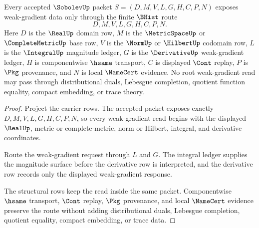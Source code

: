 \begin{theorem}
\label{thm:sobolev-root-weak-gradient-carrier}
Every accepted $\SobolevUp$ packet $S=(D,M,V,L,G,H,C,P,N)$ exposes weak-gradient data only through the finite $\BHist$ route
$$
D,M,V,L,G,H,C,P,N .
$$
Here $D$ is the $\RealUp$ domain row, $M$ is the $\MetricSpaceUp$ or $\CompleteMetricUp$ base row, $V$ is the $\NormUp$ or $\HilbertUp$ codomain row, $L$ is the $\IntegralUp$ magnitude ledger, $G$ is the $\DerivativeUp$ weak-gradient ledger, $H$ is componentwise $\hsame$ transport, $C$ is displayed $\Cont$ replay, $P$ is $\Pkg$ provenance, and $N$ is local $\NameCert$ evidence. No root weak-gradient read may pass through distributional duals, Lebesgue completion, quotient function equality, compact embedding, or trace theory.
\end{theorem}
\begin{proof}
Project the carrier rows. The accepted packet exposes exactly $D,M,V,L,G,H,C,P,N$, so every weak-gradient read begins with the displayed $\RealUp$, metric or complete-metric, norm or Hilbert, integral, and derivative coordinates.

Route the weak-gradient request through $L$ and $G$. The integral ledger supplies the magnitude surface before the derivative row is interpreted, and the derivative row records only the displayed weak-gradient response.

The structural rows keep the read inside the same packet. Componentwise $\hsame$ transport, $\Cont$ replay, $\Pkg$ provenance, and local $\NameCert$ evidence preserve the route without adding distributional duals, Lebesgue completion, quotient equality, compact embedding, or trace data.
\end{proof}

